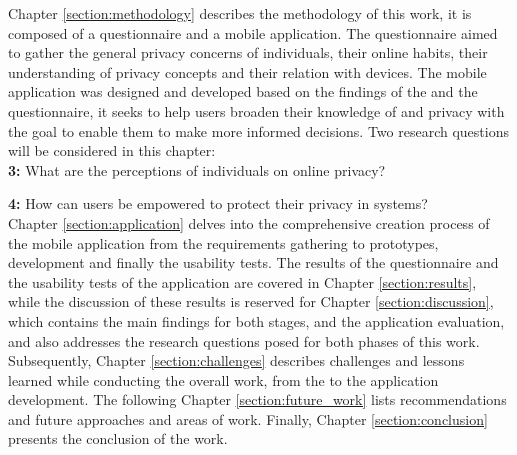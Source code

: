 Chapter \ref{section:methodology} describes the methodology of this work, it is composed of a
questionnaire and a mobile application. The questionnaire aimed to gather
the general privacy concerns of individuals, their online habits, their
understanding of privacy concepts and their relation with \hyperlink{\acronym}{\acronym} devices.
The mobile application was designed and developed based on the findings
of the \hyperlink{\acronym}{\acronym} and the questionnaire, it seeks to help users broaden their
knowledge of \hyperlink{\acronym}{\acronym} and privacy with the goal to enable them to make more
informed decisions. Two research questions will be considered in this
chapter:\\


\textbf{\hyperlink{\acronym}{\acronym}3:} What are the perceptions of individuals on online privacy?

\textbf{\hyperlink{\acronym}{\acronym}4:} How can users be empowered to protect their privacy in \hyperlink{\acronym}{\acronym} systems?\\

Chapter \ref{section:application} delves into the comprehensive creation process
of the mobile application from the requirements gathering to prototypes, development
and finally the usability tests.
The results of the questionnaire and the usability tests of the application are
covered in Chapter \ref{section:results}, while the discussion of these results is reserved for
Chapter \ref{section:discussion}, which contains the main findings for both stages, \hyperlink{\acronym}{\acronym} and the
application evaluation, and also addresses the research questions posed for both phases of
this work. Subsequently, Chapter \ref{section:challenges} describes challenges and lessons
learned while conducting the overall work, from the \hyperlink{\acronym}{\acronym} to the application
development. The following Chapter \ref{section:future_work} lists recommendations and future approaches and areas of work.
Finally, Chapter \ref{section:conclusion} presents the conclusion of the work.
